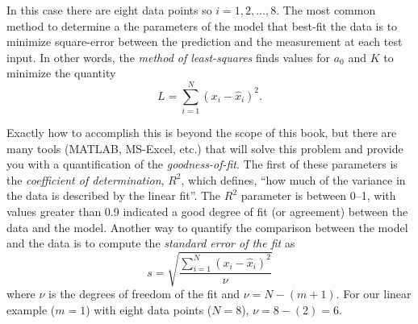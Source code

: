 In this case there are eight data points so $i=1,2,\ldots,8$.  The most common method to determine a the parameters of the model that best-fit the data is to minimize square-error between the prediction and the measurement at each test input.  In other words, the \emph{method of least-squares} finds values for $a_0$ and $K$ to minimize the quantity
\begin{equation}
L = \sum_{i=1}^N \left(x_i - \hat{x}_i \right)^2.
\end{equation}


Exactly how to accomplish this is beyond the scope of this book, but there are many tools (MATLAB, MS-Excel, etc.) that will solve this problem and provide you with a quantification of the \emph{goodness-of-fit}.  The first of these parameters is the \emph{coefficient of determination}, $R^2$, which defines, ``how much of the variance in the data is described by the linear fit''.  The $R^2$ parameter is between 0--1, with values greater than 0.9 indicated a good degree of fit (or agreement) between the data and the model.  Another way to quantify the comparison between the model and the data is to compute the \emph{standard error of the fit} as
\begin{equation}\label{e:standerror}
s = \sqrt{\frac{\sum_{i=1}^N \left(x_i - \hat{x}_i \right)^2}{\nu}}
\end{equation}
where $\nu$ is the degrees of freedom of the fit and $\nu=N-(m+1)$.  For our linear example ($m=1$) with eight data points ($N=8$), $\nu=8-(2)=6$. 
